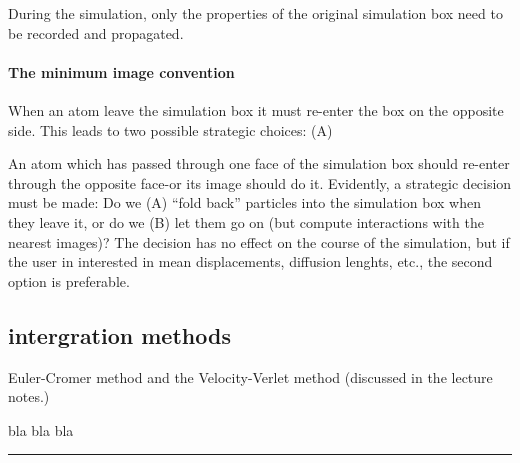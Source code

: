 \documentclass[11pt,a4wide]{article}
\begin{document}
During the simulation, only the properties of the original simulation box need to be recorded and propagated. 

\paragraph{The minimum image convention}
When an atom leave the simulation box it must re-enter the box on the opposite side. This leads to two possible strategic choices: (A) 

An atom which has passed through one face of the simulation box should re-enter through the opposite face-or its image should do it. Evidently, a strategic decision must be made: Do we (A) “fold back” particles into the simulation box when they leave it, or do we (B) let them go on (but compute interactions with the nearest images)? The decision has no effect on the course of the simulation, but if the user in interested in mean displacements, diffusion lenghts, etc., the second option is preferable.



\subsection{intergration methods}
Euler-Cromer method and the Velocity-Verlet method (discussed in the lecture notes.)
  
  
bla bla bla  
  


\rule{0.3\textwidth}{0.4pt}\par %
\end{document}
